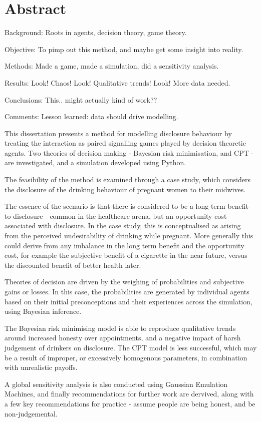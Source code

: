 \begingroup
\let\clearpage\relax
\let\cleardoublepage\relax



\section*{Abstract}

Background:
Roots in agents, decision theory, game theory.

Objective: 
To pimp out this method, and maybe get some insight into reality.

Methods: 
Made a game, made a simulation, did a sensitivity analysis.

Results: 
Look! Chaos! Look! Qualitative trends! Look! More data needed.

Conclusions:
This.. might actually kind of work??

Comments: 
Lesson learned: data should drive modelling.

This dissertation presents a method for modelling disclosure behaviour
by treating the interaction as paired signalling games played by decision
theoretic agents. Two theories of decision making - Bayesian risk
minimisation, and \ac{CPT} - are investigated, and a simulation developed
using Python.

The feasibility of the method is examined through a case study, which
considers the disclosure of the drinking behaviour of pregnant women
to their midwives. 

The essence of the scenario is that there is considered to be a long
term benefit to disclosure - common in the healthcare arena, but an
opportunity cost associated with disclosure. In the case study, this
is conceptualised as arising from the perceived undesirability of
drinking while pregnant. More generally this could derive from any
imbalance in the long term benefit and the opportunity cost, for example
the subjective benefit of a cigarette in the near future, versus the
discounted benefit of better health later.

Theories of decision are driven by the weighing of probabilities and
subjective gains or losses. In this case, the probabilities are generated
by individual agents based on their initial preconceptions and their
experiences across the simulation, using Bayesian inference.

The Bayesian risk minimising model is able to reproduce qualitative
trends around increased honesty over appointments, and a negative
impact of harsh judgement of drinkers on disclosure. The \ac{CPT}
model is less successful, which may be a result of improper, or excessively
homogenous parameters, in combination with unrealistic payoffs.

A global sensitivity analysis is also conducted using Gaussian Emulation
Machines, and finally recommendations for further work are dervived, along
with a few key recommendations for practice - assume people are being honest,
and be non-judgemental.

\vfill{}


\endgroup

